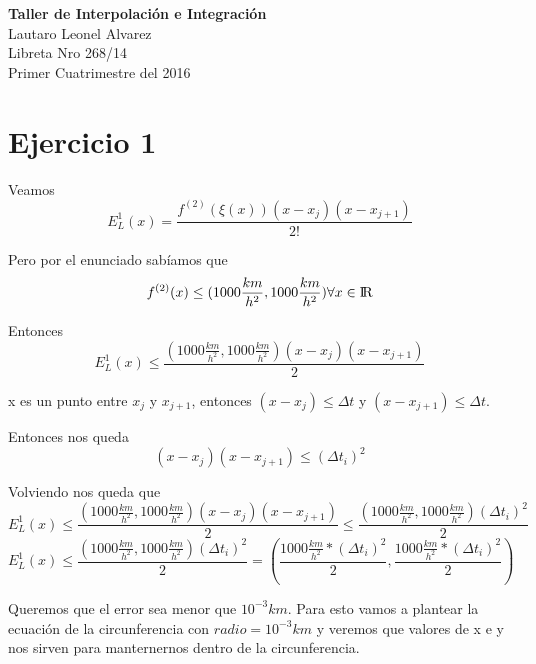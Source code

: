 \documentclass[a4paper,10pt]{article}
\begin{document}
\begin{addmargin}[8cm]{0cm}
	\textbf{Taller de Interpolación e Integración} \\
	Lautaro Leonel Alvarez \\
	Libreta Nro 268/14 \\
	Primer Cuatrimestre del 2016 \\
\end{addmargin}



\section{Ejercicio 1}
\par Veamos
\begin{equation}
	E_L^1(x) =  \frac{f^{(2)}(\xi(x))(x - x_j)(x - x_{j+1})}{2!}
\end{equation}
\par Pero por el enunciado sabíamos que
\begin{equation}
	f^{(2)}(x) \leq (1000 \frac{km}{h^2}, 1000 \frac{km}{h^2}) \forall x \in {\rm I\!R}
\end{equation}
\par Entonces
\begin{equation}
	E_L^1(x) \leq \frac{(1000 \frac{km}{h^2}, 1000 \frac{km}{h^2})(x - x_j)(x - x_{j+1})}{2}
\end{equation}
\par x es un punto entre $x_j$ y $x_{j+1}$, entonces $(x - x_j) \le \Delta t$ y $(x - x_{j+1}) \le \Delta t$.
\par Entonces nos queda
\begin{equation}
	(x - x_j)(x - x_{j+1}) \leq (\Delta t_i)^2
\end{equation}
\par Volviendo nos queda que
\begin{equation}
	E_L^1(x) \leq \frac{(1000 \frac{km}{h^2}, 1000 \frac{km}{h^2})(x - x_j)(x - x_{j+1})}{2} \leq \frac{(1000 \frac{km}{h^2}, 1000 \frac{km}{h^2})(\Delta t_i)^2}{2}
\end{equation}
\begin{equation}
	E_L^1(x) \leq \frac{(1000 \frac{km}{h^2}, 1000 \frac{km}{h^2})(\Delta t_i)^2}{2}  = (\frac{1000 \frac{km}{h^2} * (\Delta t_i)^2}{2}, \frac{1000 \frac{km}{h^2} * (\Delta t_i)^2}{2})
\end{equation}
\par Queremos que el error sea menor que $10^{-3}km$. Para esto vamos a plantear la ecuación de la circunferencia con $radio = 10^{-3}km$ y veremos que valores de x e y nos sirven para manternernos dentro de la circunferencia.
\end{document}
